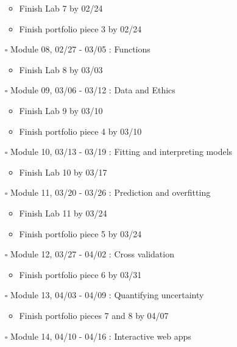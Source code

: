 \documentclass[
]{article}
\providecommand{\tightlist}{%
  \setlength{\itemsep}{0pt}\setlength{\parskip}{0pt}}
\begin{document}
\begin{itemize}
  \begin{itemize}
  \tightlist
  \item
    Finish Lab 7 by 02/24
  \item
    Finish portfolio piece 3 by 02/24
  \end{itemize}
\item[$\square$]
  Module 08, 02/27 - 03/05 : Functions

  \begin{itemize}
  \tightlist
  \item
    Finish Lab 8 by 03/03
  \end{itemize}
\item[$\square$]
  Module 09, 03/06 - 03/12 : Data and Ethics

  \begin{itemize}
  \tightlist
  \item
    Finish Lab 9 by 03/10
  \item
    Finish portfolio piece 4 by 03/10
  \end{itemize}
\item[$\square$]
  Module 10, 03/13 - 03/19 : Fitting and interpreting models

  \begin{itemize}
  \tightlist
  \item
    Finish Lab 10 by 03/17
  \end{itemize}
\item[$\square$]
  Module 11, 03/20 - 03/26 : Prediction and overfitting

  \begin{itemize}
  \tightlist
  \item
    Finish Lab 11 by 03/24
  \item
    Finish portfolio piece 5 by 03/24
  \end{itemize}
\item[$\square$]
  Module 12, 03/27 - 04/02 : Cross validation

  \begin{itemize}
  \tightlist
  \item
    Finish portfolio piece 6 by 03/31
  \end{itemize}
\item[$\square$]
  Module 13, 04/03 - 04/09 : Quantifying uncertainty

  \begin{itemize}
  \tightlist
  \item
    Finish portfolio pieces 7 and 8 by 04/07
  \end{itemize}
\item[$\square$]
  Module 14, 04/10 - 04/16 : Interactive web apps


\end{itemize}
\end{document}
